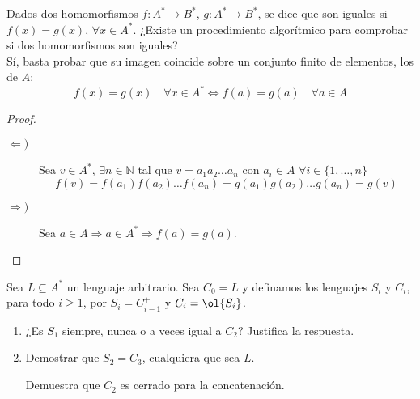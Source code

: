 \begin{ejercicio}
    Dados dos homomorfismos $f : A^{\ast} \rightarrow B^{\ast}$, $g : A^{\ast} \rightarrow B^{\ast}$, se dice que son iguales si $f(x) = g(x)$, $\forall x \in A^{\ast}$. ¿Existe un procedimiento algorítmico para comprobar si dos homomorfismos son iguales?\\

    Sí, basta probar que su imagen coincide sobre un conjunto finito de elementos, los de $A$:
    \begin{equation*}
        f(x) = g(x) \quad \forall x\in A^{\ast} \Longleftrightarrow f(a)=g(a) \quad \forall a\in A
    \end{equation*}
    \begin{proof}\ 
        \begin{description}
            \item [$\Longleftarrow)$] Sea $v\in A^{\ast}$, $\exists n\in \mathbb{N}$ tal que $v=a_1a_2\ldots a_n$ con $a_i \in A$ $\forall i \in \{1,\ldots, n\}$
                \begin{equation*}
                    f(v) = f(a_1)f(a_2)\ldots f(a_n) = g(a_1)g(a_2)\ldots g(a_n) = g(v)
                \end{equation*}
            \item [$\Longrightarrow)$] Sea $a\in A \Longrightarrow a\in A^{\ast}\Longrightarrow f(a)=g(a)$.
        \end{description}
    \end{proof}
\end{ejercicio}

\begin{ejercicio}
    Sea $L \subseteq A^{\ast}$ un lenguaje arbitrario. Sea $C_0 = L$ y definamos los lenguajes $S_i$ y $C_i$, para todo $i \geq 1$, por $S_i = C_{i-1}^+$ y $C_i = \ol{S_i}$. 
    \begin{enumerate}
        \item ¿Es $S_1$ siempre, nunca o a veces igual a $C_2$? Justifica la respuesta.
        \item Demostrar que $S_2 = C_3$, cualquiera que sea $L$.
        \begin{observacion}
            Demuestra que $C_2$ es cerrado para la concatenación.
        \end{observacion}
    \end{enumerate}
\end{ejercicio}


